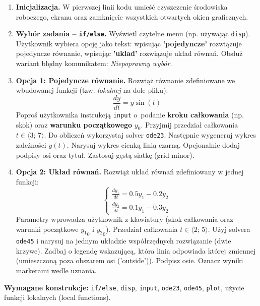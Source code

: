 \documentclass[a4paper,11pt]{article}
\begin{document}
\begin{enumerate}[leftmargin=*, label=\textbf{\arabic*.}, itemsep=2pt]

  \item \textbf{Inicjalizacja.}
    W pierwszej linii kodu umieść czyszczenie środowiska roboczego, ekranu oraz zamknięcie wszystkich otwartych okien graficznych.

  \item \textbf{Wybór zadania -- \texttt{if/else}.}
    Wyświetl czytelne menu (np. używając \texttt{disp}). Użytkownik wybiera opcję jako tekst: wpisując \textbf{'pojedyncze'} rozwiązuje pojedyncze równanie, wpisując \textbf{'uklad'} rozwiązuje układ równań. Obsłuż wariant błędny komunikatem: \textit{Niepoprawny wybór}.

  \item \textbf{Opcja 1: Pojedyncze równanie.}
    Rozwiąż równanie zdefiniowane we wbudowanej funkcji (tzw. \textit{lokalnej} na dole pliku):
    \[ \frac{dy}{dt} = y\sin(t) \]
    Poproś użytkownika instrukcją \texttt{input} o~podanie \textbf{kroku całkowania} (np. skok) oraz \textbf{warunku początkowego} $y_0$. Przyjmij przedział całkowania $t \in \langle 3;\,7 \rangle$.
    Do obliczeń wykorzystaj solver \texttt{ode23}. Następnie wygeneruj wykres zależności $y(t)$. Narysuj wykres cienką linią czarną. Opcjonalnie dodaj podpisy osi oraz tytuł. Zastosuj gęstą siatkę (grid minor).

  \item \textbf{Opcja 2: Układ równań.}
    Rozwiąż układ równań zdefiniowany w jednej funkcji:\\[-0.5em]
    \[
    \begin{cases}
      \frac{dy_1}{dt} = 0.5y_1 - 0.2y_2 \\
      \frac{dy_2}{dt} = 0.1y_1 - 0.3y_2
    \end{cases}
    \]
    Parametry wprowadza użytkownik z klawiatury (skok całkowania oraz warunki początkowe $ {y_1}_{0} $ i $ {y_2}_{0} $). Przedział całkowania $t \in \langle 2;\,5 \rangle$.
    Użyj solvera \texttt{ode45} i narysuj na jednym układzie współrzędnych rozwiązanie (dwie krzywe). Zadbaj o legendę wskazującą, która linia odpowiada której zmiennej (umieszczoną poza obszarem osi ('outside')). Podpisz osie. Oznacz wyniki markerami wedle uznania.

\end{enumerate}

\vspace{0.3cm}
\begin{ramka}
\textbf{Wymagane konstrukcje:}
\texttt{if/else}, \texttt{disp}, \texttt{input}, \texttt{ode23}, \texttt{ode45}, \texttt{plot}, użycie funkcji lokalnych (local functions).
\end{ramka}
\end{document}
